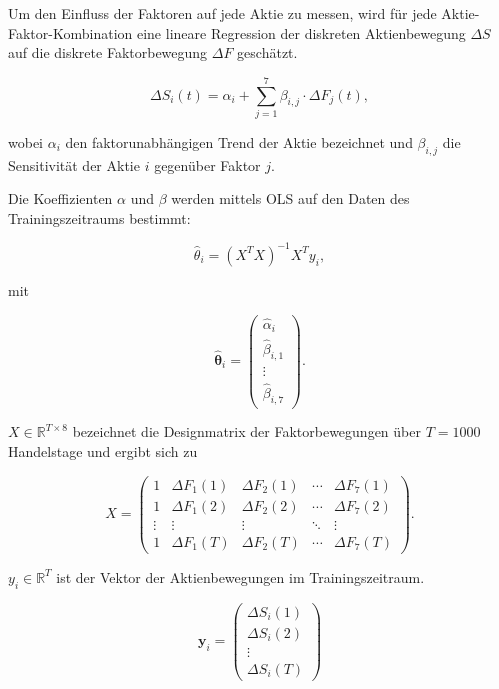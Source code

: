 Um den Einfluss der Faktoren auf jede Aktie zu messen, wird für jede Aktie-Faktor-Kombination eine lineare Regression der diskreten Aktienbewegung $\Delta S$ auf die diskrete Faktorbewegung $\Delta F$ geschätzt.

\begin{equation}
    \Delta S_i(t) = \alpha_i + \sum_{j=1}^{7} \beta_{i,j} \cdot \Delta F_j(t),
\end{equation}

wobei $\alpha_i$ den faktorunabhängigen Trend der Aktie bezeichnet und $\beta_{i,j}$ die Sensitivität der Aktie $i$ gegenüber Faktor $j$.

Die Koeffizienten $\alpha$ und $\beta$ werden mittels \ac{OLS} auf den Daten des Trainingszeitraums bestimmt:

\begin{equation}
    \hat{\theta}_i = (X^T X)^{-1} X^T y_i,
\end{equation}

mit

\begin{equation}
    \hat{\boldsymbol{\theta}}_i = \begin{pmatrix} \hat{\alpha}_i \\ \hat{\beta}_{i,1} \\ \vdots \\ \hat{\beta}_{i,7} \end{pmatrix}.
\end{equation}

$X \in \mathbb{R}^{T \times 8}$ bezeichnet die Designmatrix der Faktorbewegungen über $T = 1000$ Handelstage und ergibt sich zu

\begin{equation}
    X = \begin{pmatrix} 1 & \Delta F_1(1) & \Delta F_2(1) & \cdots & \Delta F_7(1) \\ 1 & \Delta F_1(2) & \Delta F_2(2) & \cdots & \Delta F_7(2) \\ \vdots & \vdots & \vdots & \ddots & \vdots \\ 1 & \Delta F_1(T) & \Delta F_2(T) & \cdots & \Delta F_7(T) \end{pmatrix}.
\end{equation}

$y_i \in \mathbb{R}^T$ ist der Vektor der Aktienbewegungen im Trainingszeitraum.

\begin{equation}
    \mathbf{y}_i = \begin{pmatrix} \Delta S_i(1) \\ \Delta S_i(2) \\ \vdots \\ \Delta S_i(T) \end{pmatrix}
\end{equation}



